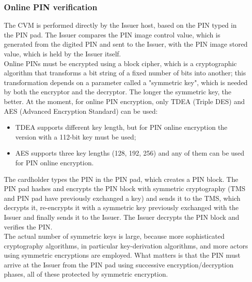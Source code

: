 \documentclass[a4paper, 10pt, titlepage]{article}
\begin{document}
\subsubsection*{Online PIN verification}
The CVM is performed directly by the Issuer host, based on the PIN typed in the PIN pad. The Issuer compares the PIN image control value, which is generated from the digited PIN and sent to the Issuer, with the PIN image stored value, which is held by the Issuer itself. \\
Online PINs must be encrypted using a block cipher, which is a cryptographic algorithm that transforms a bit string of a fixed number of bits into another; this transformation depends on a parameter called a "symmetric key", which is needed by both the encryptor and the decryptor. The longer the symmetric key, the better. At the moment, for online PIN encryption, only TDEA (Triple DES) and AES (Advanced Encryption Standard) can be used:
\begin{itemize}
\item TDEA supports different key length, but for PIN online encryption the version with a 112-bit key must be used;
\item AES supports three key lengths (128, 192, 256) and any of them can be used for PIN online encryption.
\end{itemize}
The cardholder types the PIN in the PIN pad, which creates a PIN block. The PIN pad hashes and encrypts the PIN block with symmetric cryptography (TMS and PIN pad have previously exchanged a key) and sends it to the TMS, which decrypts it, re-encrypts it with a symmetric key previously exchanged  with the Issuer and finally sends it to the Issuer.
The Issuer decrypts the PIN block and verifies the PIN. \medskip\\
The actual number of symmetric keys is large, because more sophisticated cryptography algorithms, in particular key-derivation algorithms, and more actors using symmetric encryptions are employed. What matters is that the PIN must arrive at the Issuer from the PIN pad using successive encryption/decryption phases, all of these protected by symmetric encryption.
\end{document}
